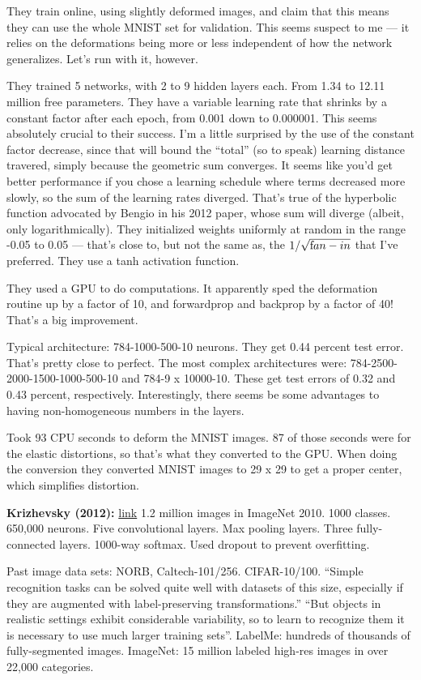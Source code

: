 \documentclass[12pt]{article}
\newcommand{\link}[2]{\href{#1}{#2}}
\begin{document}
They train online, using slightly deformed images, and claim that this
means they can use the whole MNIST set for validation.  This seems
suspect to me --- it relies on the deformations being more or less
independent of how the network generalizes.  Let's run with it,
however.

They trained 5 networks, with 2 to 9 hidden layers each.  From 1.34 to
12.11 million free parameters.  They have a variable learning rate
that shrinks by a constant factor after each epoch, from 0.001 down to
0.000001.  This seems absolutely crucial to their success. I'm a
little surprised by the use of the constant factor decrease, since
that will bound the ``total'' (so to speak) learning distance
travered, simply because the geometric sum converges.  It seems like
you'd get better performance if you chose a learning schedule where
terms decreased more slowly, so the sum of the learning rates
diverged.  That's true of the hyperbolic function advocated by Bengio
in his 2012 paper, whose sum will diverge (albeit, only
logarithmically).  They initialized weights uniformly at random in the
range -0.05 to 0.05 --- that's close to, but not the same as, the
$1/\sqrt{\mbox fan-in}$ that I've preferred.  They use a tanh
activation function.

They used a GPU to do computations.  It apparently sped the
deformation routine up by a factor of 10, and forwardprop and backprop
by a factor of 40!  That's a big improvement.

Typical architecture: 784-1000-500-10 neurons.  They get 0.44 percent
test error.  That's pretty close to perfect.  The most complex
architectures were: 784-2500-2000-1500-1000-500-10 and 784-9 x
10000-10.  These get test errors of 0.32 and 0.43 percent,
respectively.  Interestingly, there seems be some advantages to having
non-homogeneous numbers in the layers.

Took 93 CPU seconds to deform the MNIST images.  87 of those seconds
were for the elastic distortions, so that's what they converted to the
GPU.  When doing the conversion they converted MNIST images to 29 x 29
to get a proper center, which simplifies distortion.

\textbf{Krizhevsky (2012):}
\link{http://www.cs.toronto.edu/~hinton/absps/imagenet.pdf}{link} 1.2
million images in ImageNet 2010.  1000 classes.  650,000 neurons.
Five convolutional layers.  Max pooling layers.  Three fully-connected
layers.  1000-way softmax.  Used dropout to prevent overfitting.

Past image data sets: NORB, Caltech-101/256. CIFAR-10/100.  ``Simple
recognition tasks can be solved quite well with datasets of this size,
especially if they are augmented with label-preserving
transformations.''  ``But objects in realistic settings exhibit
considerable variability, so to learn to recognize them it is
necessary to use much larger training sets''.  LabelMe: hundreds of
thousands of fully-segmented images.  ImageNet: 15 million labeled
high-res images in over 22,000 categories.
\end{document}
